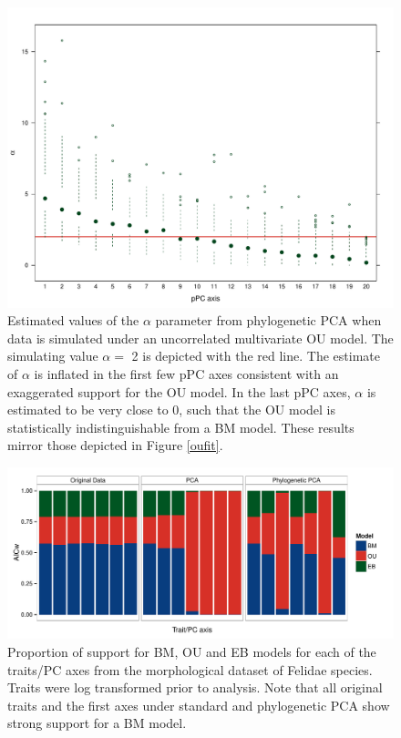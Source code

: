 \documentclass[a4paper,11pt]{article}
\begin{document}
\begin{figure}[p]
\centering
\includegraphics[scale=0.65]{fig/alpha-est.pdf}
\caption{Estimated values of the $\alpha$ parameter from phylogenetic PCA when data is simulated under an uncorrelated multivariate OU model. The simulating value $\alpha=$ 2 is depicted with the red line. The estimate of $\alpha$ is inflated in the first few pPC axes consistent with an exaggerated support for the OU model. In the last pPC axes, $\alpha$ is estimated to be very close to 0, such that the OU model is statistically indistinguishable from a BM model. These results mirror those depicted in Figure \ref{oufit}.}
\label{alpha}
\end{figure}

\begin{figure}[p]
\centering
\includegraphics[scale=0.65]{fig/felidae_aicw.pdf}
\caption{Proportion of support for BM, OU and EB models for each of the traits/PC axes from the morphological dataset of Felidae species. Traits were log transformed prior to analysis. Note that all original traits and the first axes under standard and phylogenetic PCA show strong support for a BM model.}
\label{felidae.aicw}
\end{figure}
\end{document}

